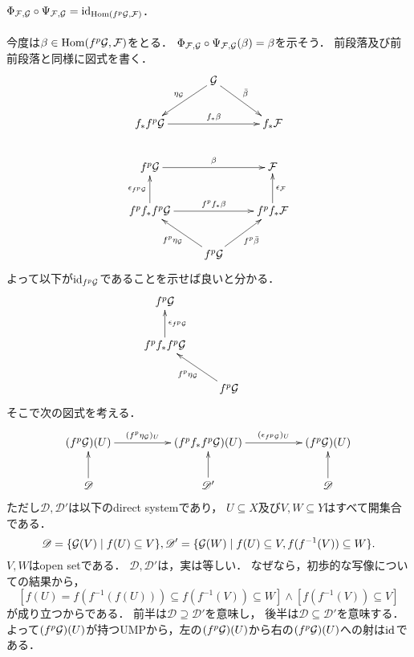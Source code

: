 \documentclass[a4paper]{jsarticle}
\begin{document}
    \paragraph{$\Phi_{\mathcal{F}, \mathcal{G}} \circ \Psi_{\mathcal{F}, \mathcal{G}}=\mathrm{id}_{\operatorname{Hom}(f^p\mathcal{G}, \mathcal{F})}$.}
    今度は$\beta \in \operatorname{Hom}(f^p\mathcal{G}, \mathcal{F})$をとる．
    $\Phi_{\mathcal{F}, \mathcal{G}} \circ \Psi_{\mathcal{F}, \mathcal{G}}(\beta)=\beta$を示そう．
    前段落及び前前段落と同様に図式を書く．
    \[
        \xymatrix
        {
        {} & \shG \ar[ld]_-{\eta_{\shG}} \ar[rd]^-{\bar{\beta}} & {} \\
        f_* f^p\shG \ar[rr]^-{f_* \beta} & {} & f_* \shF \\
        f^p \shG \ar[rr]^-{\beta} & {} & \shF \\
        f^p f_* f^p \shG \ar[u]^-{\epsilon_{f^p \shG}}  \ar[rr]^-{f^p f_* \beta} & {} & f^p f_* \shF \ar[u]_-{\epsilon_{\shF}} \\
        {} & f^p \shG \ar[ru]_-{f^p \bar{\beta}} \ar[lu]^-{f^p \eta_{\shG}} & {} \\
        }
    \]
    よって以下が$\mathrm{id}_{f^p\mathcal{G}}$であることを示せば良いと分かる．
    \[
        \xymatrix
        {
        f^p \shG & {} & {} \\
        f^p f_* f^p \shG \ar[u]_-{\epsilon_{f^p \shG}} & {} & {} \\
        {} & f^p \shG\ar[lu]^-{f^p \eta_{\shG}} & {} \\
        }
    \]
    そこで次の図式を考える．
    \[
        \xymatrix@C=5em
        {
        (f^p \shG)(U) \ar[r]^-{(f^p \eta_{\shG})_U}
        & (f^p f_* f^p \shG)(U) \ar@{->}[r]^-{(\epsilon_{f^p\shG})_U}
        & (f^p \shG)(U) \\
        \mathscr{D} \ar[u]& \mathscr{D}' \ar[u]& \mathscr{D} \ar[u]
        }
    \]
    ただし$\mathscr{D}, \mathscr{D}'$は以下のdirect systemであり，
    $U \subseteq X$及び$V,W \subseteq Y$はすべて開集合である．
    \[ \mathscr{D}=\{\mathcal{G}(V) \mid f(U) \subseteq V \}, \mathscr{D}'=\{ \mathcal{G}(W) \mid f(U) \subseteq V, f(f^{-1}(V)) \subseteq W \}. \]
    $V,W$はopen setである．
    $\mathscr{D}, \mathscr{D}'$は，実は等しい．
    なぜなら，初歩的な写像についての結果から，
    \[ [f(U)=f(f^{-1}(f(U))) \subseteq f(f^{-1}(V)) \subseteq W] \land [f(f^{-1}(V)) \subseteq V] \]
    が成り立つからである．
    前半は$\mathscr{D} \supseteq \mathscr{D}'$を意味し，
    後半は$\mathscr{D} \subseteq \mathscr{D}'$を意味する．
    よって$(f^p \mathcal{G})(U)$が持つUMPから，左の$(f^p \mathcal{G})(U)$から右の$(f^p \mathcal{G})(U)$への射は$\mathrm{id}_{}$である．
\end{document}
